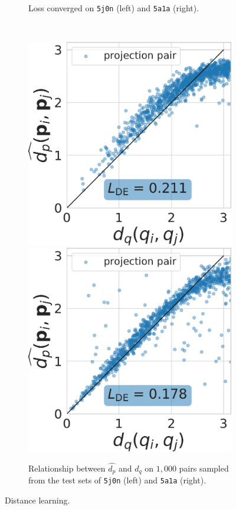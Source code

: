 \begin{figure}
\begin{minipage}[b]{0.45\linewidth}
\begin{subfigure}[b]{\linewidth}
            \caption{Loss converged on \texttt{5j0n} (left) and \texttt{5a1a} (right).
            \vspace{0.8em}}%
            \label{fig:distance-learning:loss}
        \end{subfigure}
        \\ %
        \begin{subfigure}[b]{\linewidth}
            \centering
            \includegraphics[width=0.40\linewidth]{figures/dPdQ_5j0n_fullcvg_uniformS2_noise0.pdf}
            \hspace{0.5cm}
            \includegraphics[width=0.40\linewidth]{figures/dPdQ_5a1a_quartercvg_uniformS2_noise0.pdf}
            \caption{Relationship between $\widehat{d_p}$ and $d_q$ on $1,000$ pairs sampled from the test sets of \texttt{5j0n} (left) and \texttt{5a1a} (right).
            }\label{fig:distance-learning:dpdq}
        \end{subfigure}
        \caption{Distance learning.
        }
    \end{minipage}
\end{figure}

